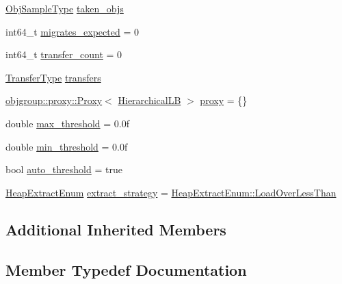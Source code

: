 \begin{DoxyCompactItemize}
\item 
\hyperlink{structvt_1_1vrt_1_1collection_1_1lb_1_1_base_l_b_a331d7da5bbf2883238427d86b54ddd7b}{Obj\+Sample\+Type} \hyperlink{structvt_1_1vrt_1_1collection_1_1lb_1_1_hierarchical_l_b_a72831d31662a79dcb0cf5e1f9f2499dc}{taken\+\_\+objs}
\item 
int64\+\_\+t \hyperlink{structvt_1_1vrt_1_1collection_1_1lb_1_1_hierarchical_l_b_a79229451e82b523ca25e81c8249cc048}{migrates\+\_\+expected} = 0
\item 
int64\+\_\+t \hyperlink{structvt_1_1vrt_1_1collection_1_1lb_1_1_hierarchical_l_b_a858f07d19923904e7a8bb4a93c96041c}{transfer\+\_\+count} = 0
\item 
\hyperlink{structvt_1_1vrt_1_1collection_1_1lb_1_1_base_l_b_a0a5f834082d85c558bdaf84c464c1ead}{Transfer\+Type} \hyperlink{structvt_1_1vrt_1_1collection_1_1lb_1_1_hierarchical_l_b_ab9aad1307a83953ea436e1e3d865bbd0}{transfers}
\item 
\hyperlink{structvt_1_1objgroup_1_1proxy_1_1_proxy}{objgroup\+::proxy\+::\+Proxy}$<$ \hyperlink{structvt_1_1vrt_1_1collection_1_1lb_1_1_hierarchical_l_b}{Hierarchical\+LB} $>$ \hyperlink{structvt_1_1vrt_1_1collection_1_1lb_1_1_hierarchical_l_b_a116c56497faa79eff02d0f4b9932eba5}{proxy} = \{\}
\item 
double \hyperlink{structvt_1_1vrt_1_1collection_1_1lb_1_1_hierarchical_l_b_a14170b4d5e34cb45fd9e3ba08f6886cb}{max\+\_\+threshold} = 0.\+0f
\item 
double \hyperlink{structvt_1_1vrt_1_1collection_1_1lb_1_1_hierarchical_l_b_ab7ef9cc6d966759b3634d04427cab1b5}{min\+\_\+threshold} = 0.\+0f
\item 
bool \hyperlink{structvt_1_1vrt_1_1collection_1_1lb_1_1_hierarchical_l_b_a4f1e749384f8ae015ed1aabaa1b9a732}{auto\+\_\+threshold} = true
\item 
\hyperlink{namespacevt_1_1vrt_1_1collection_1_1lb_aeb0f47cf4b89bed7ea05462d0c2e5b5e}{Heap\+Extract\+Enum} \hyperlink{structvt_1_1vrt_1_1collection_1_1lb_1_1_hierarchical_l_b_a3bbe0e2597f6c01024f058d20ae9d26e}{extract\+\_\+strategy} = \hyperlink{namespacevt_1_1vrt_1_1collection_1_1lb_aeb0f47cf4b89bed7ea05462d0c2e5b5ea41a33133c182e43b9dfc2599f39eaa94}{Heap\+Extract\+Enum\+::\+Load\+Over\+Less\+Than}
\end{DoxyCompactItemize}
\subsection*{Additional Inherited Members}


\subsection{Member Typedef Documentation}
\mbox{\label{structvt_1_1vrt_1_1collection_1_1lb_1_1_hierarchical_l_b_a95e5a93033703216cad8ec7a3da7a2ef}} 
